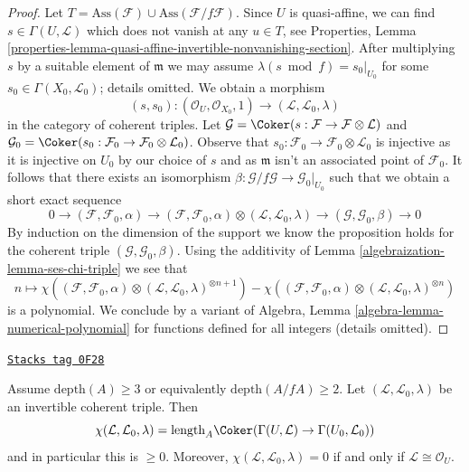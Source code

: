 \begin{proof}
\medskip\noindent
Let $T = \text{Ass}(\mathcal{F}) \cup \text{Ass}(\mathcal{F}/f\mathcal{F})$.
Since $U$ is quasi-affine, we can find $s \in \Gamma(U, \mathcal{L})$
which does not vanish at any $u \in T$, see
Properties, Lemma
\ref{properties-lemma-quasi-affine-invertible-nonvanishing-section}.
After multiplying $s$ by a suitable element of $\mathfrak m$
we may assume $\lambda(s \bmod f) = s_0|_{U_0}$ for some
$s_0 \in \Gamma(X_0, \mathcal{L}_0)$; details omitted.
We obtain a morphism
$$
(s, s_0) :
(\mathcal{O}_U, \mathcal{O}_{X_0}, 1)
\longrightarrow
(\mathcal{L}, \mathcal{L}_0, \lambda)
$$
in the category of coherent triples. Let
$\mathcal{G} = \Coker(s : \mathcal{F} \to \mathcal{F} \otimes \mathcal{L})$
and
$\mathcal{G}_0 = \Coker(s_0 : \mathcal{F}_0 \to
\mathcal{F}_0 \otimes \mathcal{L}_0)$. Observe that $s_0 : \mathcal{F}_0 \to
\mathcal{F}_0 \otimes \mathcal{L}_0$ is injective as it is injective
on $U_0$ by our choice of $s$ and as $\mathfrak m$ isn't an
associated point of $\mathcal{F}_0$. It follows that
there exists an
isomorphism $\beta : \mathcal{G}/f\mathcal{G} \to \mathcal{G}_0|_{U_0}$
such that we obtain a short exact sequence
$$
0 \to
(\mathcal{F}, \mathcal{F}_0, \alpha) \to
(\mathcal{F}, \mathcal{F}_0, \alpha) \otimes
(\mathcal{L}, \mathcal{L}_0, \lambda) \to
(\mathcal{G}, \mathcal{G}_0, \beta) \to 0
$$
By induction on the dimension of the support we know the proposition
holds for the coherent triple $(\mathcal{G}, \mathcal{G}_0, \beta)$.
Using the additivity of Lemma \ref{algebraization-lemma-ses-chi-triple}
we see that
$$
n \longmapsto
\chi((\mathcal{F}, \mathcal{F}_0, \alpha) \otimes
(\mathcal{L}, \mathcal{L}_0, \lambda)^{\otimes n + 1})
-
\chi((\mathcal{F}, \mathcal{F}_0, \alpha) \otimes
(\mathcal{L}, \mathcal{L}_0, \lambda)^{\otimes n})
$$
is a polynomial. We conclude by a variant of
Algebra, Lemma \ref{algebra-lemma-numerical-polynomial}
for functions defined for all integers (details omitted).
\end{proof}

\begin{lemma}
\label{algebraization-lemma-nonnegative-chi-triple}
\href{https://stacks.math.columbia.edu/tag/0F28}{\texttt{Stacks tag 0F28}}

Assume $\text{depth}(A) \geq 3$ or equivalently
$\text{depth}(A/fA) \geq 2$. Let $(\mathcal{L}, \mathcal{L}_0, \lambda)$
be an invertible coherent triple. Then
$$
\chi(\mathcal{L}, \mathcal{L}_0, \lambda) =
\text{length}_A \Coker(\Gamma(U, \mathcal{L}) \to \Gamma(U_0, \mathcal{L}_0))
$$
and in particular this is $\geq 0$. Moreover,
$\chi(\mathcal{L}, \mathcal{L}_0, \lambda) = 0$ if and only if
$\mathcal{L} \cong \mathcal{O}_U$.
\end{lemma}

